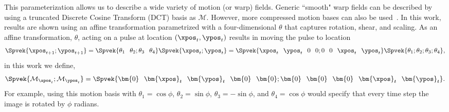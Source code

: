 This parameterization allows us to describe a wide variety of motion (or warp) fields. 
Generic ``smooth" warp fields can be described by using a truncated Discrete Cosine Transform (DCT) basis as $\mathcal{M}$.
However, more compressed motion bases can also be used~\cite{lowdim14, erikmiller}. 
In this work, results are shown using an affine transformation parametrized with a four-dimensional $\theta$ that captures rotation, shear, and scaling. As an affine transformation, $\theta$, acting on a pulse at location $(\xpos_t, \ypos_t)$ results in moving the pulse to location
    \begin{align}
    \Spvek{{\xpos}_{t+1}; {\ypos}_{t+1}} = \Spvek{\theta_1 \hspace{.1in}\theta_2 ; 
    	\theta_3 \hspace{.1in}\theta_4  } \Spvek{{\xpos}_{t}; {\ypos}_{t}} = \Spvek{ \xpos_t \hspace{.1in} \ypos_t \hspace{.1in}0 \hspace{.1in} 0 ; 
    	0 \hspace{.1in}0 \hspace{.1in} \xpos_t \hspace{.1in} \ypos_t } \Spvek{\theta_1; \theta_2; \theta_3; \theta_4},
    \end{align}
 in this work we define, 
   \begin{align}
  \Spvek{\mathcal{M}_{\xpos_t}; \mathcal{M}_{\ypos_t}}  =  \Spvek{\bm{0} \hspace{.1in} \bm{\xpos}_t \hspace{.1in} \bm{\ypos}_t \hspace{.1in} \bm{0} \hspace{.1in} \bm{0} ; \bm{0} \hspace{.1in}
   	\bm{0} \hspace{.1in} \bm{0} \hspace{.1in} \bm{\xpos}_t \hspace{.1in} \bm{\ypos}_t } .
   \end{align}
For example, using this motion basis with $\theta_1 = \cos \phi$, $\theta_2 = \sin \phi$, $\theta_3 = -\sin \phi$, and $\theta_4 = \cos \phi$ would specify that every time step the image is rotated by $\phi$ radians. 




